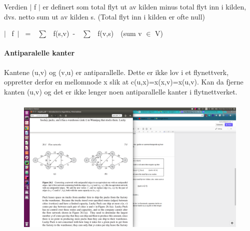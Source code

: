 \documentclass[12pt]{report}
\begin{document}


\vspace{\baselineskip}
Verdien $ \vert $  f $ \vert $  er definert som total flyt ut av kilden minus total flyt inn i kilden, dvs. netto sum ut av kilden s. (Total flyt inn i kilden er ofte null)\par


\vspace{\baselineskip}
\begin{Center}
$ \vert $ \ f\ $ \vert $ \ =\ \ $ \sum $ \ f(s,v)\ -\ \ $ \sum $ \ f(v,s)\ \          (sum v $ \in $  V)
\end{Center}\par

\paragraph*{Antiparalelle kanter}
Kantene (u,v) og (v,u) er antiparallelle. Dette er ikke lov i et flynettverk, oppretter derfor en mellomnode x slik at c(u,x)=x(x,v)=x(u,v). Kan da fjerne kanten (u,v) og det er ikke lenger noen antiparallelle kanter i flytnettverket. \par




\begin{figure}[H]
	\begin{Center}
		\includegraphics[width=6.05in,height=2.65in]{./media/image140.png}
	\end{Center}
\end{figure}


\end{document}
